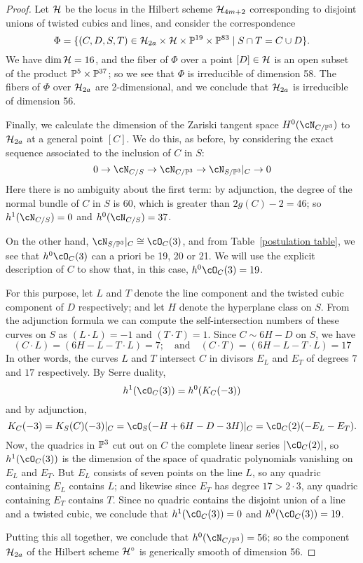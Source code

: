 \begin{proof}
Let $\cH$ be the locus in the Hilbert scheme $\cH_{4m+2}$ corresponding to disjoint unions of twisted cubics and lines, and consider the correspondence
$$
\Phi = \{(C,D,S,T) \in \cH_{2a} \times \cH \times \PP^{19} \times \PP^{83} \mid S \cap T = C \cup D \}.
$$
We have $\dim \cH = 16$, and the fiber of $\Phi$ over a point $[D] \in \cH$ is an open subset of the product $\PP^5 \times \PP^{37}$;  so we see that $\Phi$ is irreducible of dimension 58. The fibers of $\Phi$ over $ \cH_{2a}$ are 2-dimensional, and we conclude that $\cH_{2a}$ is irreducible of dimension 56.

Finally, we calculate the dimension of the Zariski tangent space $H^0(\cN_{C/\PP^3})$ to $\cH_{2a}$ at a general point $[C]$. We do this, as before, by considering the exact sequence associated to the inclusion of $C$ in $S$:
$$
0 \to \cN_{C/S} \to \cN_{C/\PP^3} \to \cN_{S/\PP^3}|_C \to 0
$$ 
Here there is no ambiguity about the first term: by adjunction, the degree of the normal bundle of $C$ in $S$
is 60, which is greater than $2g(C) - 2 = 46$; so $h^1(\cN_{C/S}) = 0$ and $h^0(\cN_{C/S}) = 37$.

On the other hand, $\cN_{S/\PP^3}|_C \cong \cO_C(3)$, and from Table~\ref{postulation table}, we see that $h^0 \cO_C(3)$ can a priori be 19, 20 or 21. We will use the explicit description of $C$ to show that,  in this case, $h^0 \cO_C(3)=19$.

For this purpose, let $L$ and $T$ denote the line component and the twisted cubic component of $D$ respectively; and let $H$ denote the hyperplane class on $S$. From the adjunction formula we can compute the self-intersection numbers of these curves on $S$ as $(L \cdot L) = -1$ and $(T \cdot T) = 1$. Since $C \sim 6H - D$ on $S$, we have
$$
(C\cdot L) = (6H - L - T \cdot L) = 7; \quad \text{and} \quad (C\cdot T) = (6H - L - T \cdot L) = 17
$$
In other words, the curves $L$ and $T$ intersect $C$ in divisors $E_L$ and $E_T$ of degrees $7$ and $17$ respectively. By Serre duality, 
$$
h^1(\cO_C(3)) = h^0(K_C(-3)) 
$$
and by adjunction,
$$
K_C(-3) = K_S(C)(-3)|_C = \cO_S(-H + 6H - D - 3H)|_C = \cO_C(2)(-E_L-E_T).
$$
Now, the quadrics in $\PP^3$ cut out on $C$ the complete linear series $|\cO_C(2)|$,  so $h^1(\cO_C(3))$ is the dimension of the space of quadratic polynomials vanishing on $E_L$ and $E_T$. But $E_L$ consists of seven points on the line $L$, so any quadric containing $E_L$ contains $L$; and likewise since $E_T$ has degree $17 > 2\cdot 3$, any quadric containing $E_T$ contains $T$. Since no quadric contains the disjoint union of a line and a twisted cubic, we conclude that $h^1(\cO_C(3))=0$ and $h^0(\cO_C(3)) = 19$.

Putting this all together, we conclude that $h^0(\cN_{C/\PP^3}) = 56$; so the component $\cH_{2a}$ of the Hilbert scheme $\cH^\circ$ is generically smooth of dimension 56.
\end{proof}

